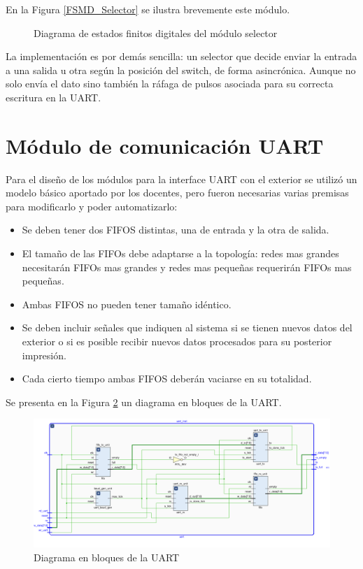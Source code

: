 		En la Figura \ref{FSMD_Selector} se ilustra brevemente este módulo.
		
		\begin{figure}[h]
		\centering
			\caption{Diagrama de estados finitos digitales del módulo selector}
			\label{fig:FSMD_Selector}
		\end{figure}	
		
		La implementación es por demás sencilla: un selector que decide enviar la entrada a una salida u otra según la posición del switch, de forma asincrónica. Aunque no solo envía el dato sino también la ráfaga de pulsos asociada para su correcta escritura en la UART.
		
\section{Módulo de comunicación UART}

	Para el diseño de los módulos para la interface UART con el exterior se utilizó un modelo básico aportado por los docentes, pero fueron necesarias varias premisas para modificarlo y poder automatizarlo:
	
	\begin{itemize}
		\item Se deben tener dos FIFOS distintas, una de entrada y la otra de salida.
		\item El tamaño de las FIFOs debe adaptarse a la topología: redes mas grandes necesitarán FIFOs mas grandes y redes mas pequeñas requerirán FIFOs mas pequeñas.
		\item Ambas FIFOS no pueden tener tamaño idéntico.
		\item Se deben incluir señales que indiquen al sistema si se tienen nuevos datos del exterior o si es posible recibir nuevos datos procesados para su posterior impresión.
		\item Cada cierto tiempo ambas FIFOS deberán vaciarse en su totalidad.		
	\end{itemize}
	
		Se presenta en la Figura \ref{fig:FSMD_UART} un diagrama en bloques de la UART.
			
		\begin{figure}[h]
		\centering
		\includegraphics[scale=.35]{./Figures/UART}
			\caption{Diagrama en bloques de la UART}
			\label{fig:FSMD_UART}
		\end{figure}

